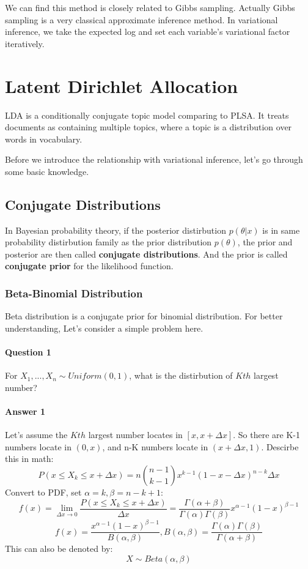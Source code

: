 \documentclass{article}
\begin{document}
We can find this method is closely related to Gibbs sampling. Actually Gibbs sampling is a very classical approximate inference method. In variational inference,
we take the expected log and set each variable’s variational factor iteratively.
\section{Latent Dirichlet Allocation}
LDA\cite{geigle2016inference} is a conditionally conjugate topic model comparing to PLSA. It treats documents as containing multiple topics, where a topic is a distribution over words in vocabulary. 

Before we introduce the relationship with variational inference, let's go through some basic knowledge.
\subsection{Conjugate Distributions}
In Bayesian probability theory, if the posterior distirbution $p(\theta | x)$ is in same probability distirbution family as the prior distribution $p(\theta)$, the prior and posterior are then called \textbf{conjugate distributions}. And the prior is called \textbf{conjugate prior} for the likelihood function.

\subsubsection{Beta-Binomial Distribution}
Beta distribution is a conjugate prior for binomial distribution. For better understanding, Let's consider a simple problem here. 
\paragraph{Question 1} For $X_{1},...,X_{n} \sim Uniform(0,1)$, what is the distirbution of $Kth$ largest number? 
\paragraph{Answer 1} Let's assume the $Kth$ largest number locates in $[x,x+\Delta x]$. So there are K-1 numbers locate in $(0,x)$, and n-K numbers locate in $(x+\Delta x,1)$. Descirbe this in math: 
$$P(x \leq X_{k} \leq x+\Delta x)=n \binom {n-1} {k-1} x^{k-1}(1-x-\Delta x)^{n-k}\Delta x$$
Convert to PDF, set $\alpha=k, \beta=n-k+1$:
$$f(x)= \lim_{\Delta x \rightarrow 0} \frac{P(x \leq X_{k} \leq x+\Delta x)}{\Delta x} =\frac{\Gamma(\alpha+\beta)}{\Gamma(\alpha)\Gamma(\beta)}x^{\alpha-1}(1-x)^{\beta-1} $$
$$f(x)=\frac{x^{\alpha-1}(1-x)^{\beta-1}}{B(\alpha,\beta)}, B(\alpha,\beta)=\frac{\Gamma(\alpha)\Gamma(\beta)}{\Gamma(\alpha+\beta)}$$
This can also be denoted by:
$$X \sim Beta(\alpha,\beta)$$
\end{document}
